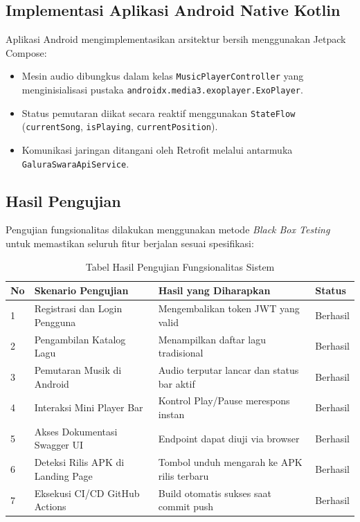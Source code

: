 \subsection{Implementasi Aplikasi Android Native Kotlin}
Aplikasi Android mengimplementasikan arsitektur bersih menggunakan Jetpack Compose:
\begin{itemize}
    \item Mesin audio dibungkus dalam kelas \texttt{MusicPlayerController} yang menginisialisasi pustaka \texttt{androidx.media3.exoplayer.ExoPlayer}.
    \item Status pemutaran diikat secara reaktif menggunakan \texttt{StateFlow} (\texttt{currentSong}, \texttt{isPlaying}, \texttt{currentPosition}).
    \item Komunikasi jaringan ditangani oleh Retrofit melalui antarmuka \texttt{GaluraSwaraApiService}.
\end{itemize}

\subsection{Hasil Pengujian}
Pengujian fungsionalitas dilakukan menggunakan metode \textit{Black Box Testing} untuk memastikan seluruh fitur berjalan sesuai spesifikasi:

\begin{table}[htbp]
\centering
\caption{Tabel Hasil Pengujian Fungsionalitas Sistem}
\label{tab:pengujian}
\begin{tabularx}{\textwidth}{|l|X|l|l|}
\hline
\textbf{No} & \textbf{Skenario Pengujian} & \textbf{Hasil yang Diharapkan} & \textbf{Status} \\
\hline
1 & Registrasi dan Login Pengguna & Mengembalikan token JWT yang valid & Berhasil \\
\hline
2 & Pengambilan Katalog Lagu & Menampilkan daftar lagu tradisional & Berhasil \\
\hline
3 & Pemutaran Musik di Android & Audio terputar lancar dan status bar aktif & Berhasil \\
\hline
4 & Interaksi Mini Player Bar & Kontrol Play/Pause merespons instan & Berhasil \\
\hline
5 & Akses Dokumentasi Swagger UI & Endpoint dapat diuji via browser & Berhasil \\
\hline
6 & Deteksi Rilis APK di Landing Page & Tombol unduh mengarah ke APK rilis terbaru & Berhasil \\
\hline
7 & Eksekusi CI/CD GitHub Actions & Build otomatis sukses saat commit push & Berhasil \\
\hline
\end{tabularx}
\end{table}
